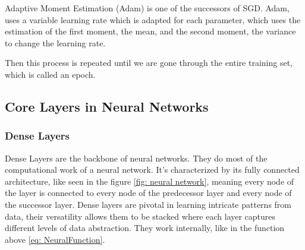 Adaptive Moment Estimation (Adam)\cite{kingma_adam_2017} is one of the successors of SGD. Adam, uses a variable learning rate which is adapted for each parameter, which uses the estimation of the first moment, the mean, and the second moment, the variance to change the learning rate.

Then this process is repeated until we are gone through the entire training set, which is called an epoch.
\subsection{Core Layers in Neural Networks}\label{subsec:core-layers-in-neural-networks}
\subsubsection{Dense Layers}
Dense Layers are the backbone of neural networks.
They do most of the computational work of a neural network.
It's characterized by its fully connected architecture, like seen in the figure \ref{fig: neural network}, meaning every node of the layer is connected to every node of the predecessor layer and every node of the successor layer.
Dense layers are pivotal in learning intricate patterns from data, their versatility allows them to be stacked where each layer captures different levels of data abstraction.
They work internally, like in the function above \ref{eq: NeuralFunction}.
